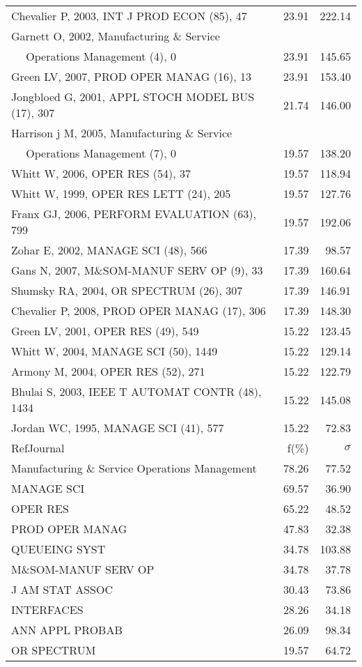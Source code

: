 \documentclass[a4paper,11pt]{report}
\begin{document}
\begin{landscape}
\begin{table}[!ht]
{\begin{tabular}{|l r r|}
Chevalier P, 2003, INT J PROD ECON (85), 47 & 23.91 & 222.14\\
Garnett O, 2002, Manufacturing \& Service &  & \\
$\quad$ Operations Management (4), 0 & 23.91 & 145.65\\
Green LV, 2007, PROD OPER MANAG (16), 13 & 23.91 & 153.40\\
Jongbloed G, 2001, APPL STOCH MODEL BUS (17), 307 & 21.74 & 146.00\\
Harrison j M, 2005, Manufacturing \& Service &  & \\
$\quad$ Operations Management (7), 0 & 19.57 & 138.20\\
Whitt W, 2006, OPER RES (54), 37 & 19.57 & 118.94\\
Whitt W, 1999, OPER RES LETT (24), 205 & 19.57 & 127.76\\
Franx GJ, 2006, PERFORM EVALUATION (63), 799 & 19.57 & 192.06\\
Zohar E, 2002, MANAGE SCI (48), 566 & 17.39 & 98.57\\
Gans N, 2007, M\&SOM-MANUF SERV OP (9), 33 & 17.39 & 160.64\\
Shumsky RA, 2004, OR SPECTRUM (26), 307 & 17.39 & 146.91\\
Chevalier P, 2008, PROD OPER MANAG (17), 306 & 17.39 & 148.30\\
Green LV, 2001, OPER RES (49), 549 & 15.22 & 123.45\\
Whitt W, 2004, MANAGE SCI (50), 1449 & 15.22 & 129.14\\
Armony M, 2004, OPER RES (52), 271 & 15.22 & 122.79\\
Bhulai S, 2003, IEEE T AUTOMAT CONTR (48), 1434 & 15.22 & 145.08\\
Jordan WC, 1995, MANAGE SCI (41), 577 & 15.22 & 72.83\\
\hline
\hline
RefJournal & f(\%) & $\sigma$\\
\hline
Manufacturing \& Service Operations Management & 78.26 & 77.52\\
MANAGE SCI & 69.57 & 36.90\\
OPER RES & 65.22 & 48.52\\
PROD OPER MANAG & 47.83 & 32.38\\
QUEUEING SYST & 34.78 & 103.88\\
M\&SOM-MANUF SERV OP & 34.78 & 37.78\\
J AM STAT ASSOC & 30.43 & 73.86\\
INTERFACES & 28.26 & 34.18\\
ANN APPL PROBAB & 26.09 & 98.34\\
OR SPECTRUM & 19.57 & 64.72\\
\hline
\end{tabular}
}
\end{table}

\end{landscape}
\end{document}
